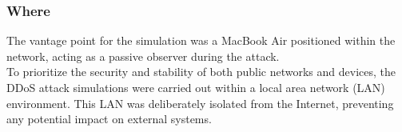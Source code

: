 \subsubsection*{Where}
The vantage point for the simulation was a MacBook Air positioned within the network,
acting as a passive observer during the attack.\\
To prioritize the security and stability of both public networks and devices,
the DDoS attack simulations were carried out within a local area network (LAN) environment.
This LAN was deliberately isolated from the Internet, preventing any potential impact on external systems.\\

